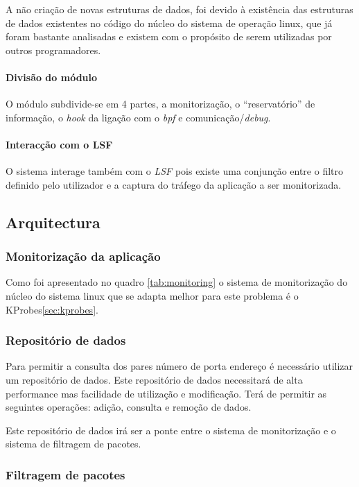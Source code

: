 A não criação de novas estruturas de dados, foi devido à existência das
estruturas de dados existentes no código do núcleo do sistema de operação
linux, que já foram bastante analisadas e existem com o propósito de serem
utilizadas por outros programadores.

\paragraph{Divisão do módulo} 

O módulo subdivide-se em 4 partes, a monitorização, o ``reservatório'' de
informação, o \textit{hook} da ligação com o \textit{bpf} e
comunicação/\textit{debug}.

\paragraph{Interacção com o LSF}
O sistema interage também com o \textit{LSF} pois existe uma conjunção
entre o filtro definido pelo utilizador e a captura do tráfego da aplicação a
ser monitorizada.

\subsection{Arquitectura}

\subsubsection{Monitorização da aplicação}

Como foi apresentado no quadro \ref{tab:monitoring} o sistema de monitorização
do núcleo do sistema linux que se adapta melhor para este problema é o
KProbes\ref{sec:kprobes}. 

\subsubsection{Repositório de dados}

Para permitir a consulta dos pares número de porta endereço é necessário
utilizar um repositório de dados. Este repositório de dados necessitará de alta
performance mas facilidade de utilização e modificação. Terá de permitir as
seguintes operações: adição, consulta e remoção de dados.

Este repositório de dados irá ser a ponte entre o sistema de  monitorização e o
sistema de filtragem de pacotes. 

\subsubsection{Filtragem de pacotes}

